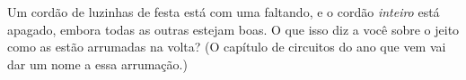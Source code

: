 \begin{exercise}[$\star\star$]\label{exo:g3:first-electric-circuit:11}
Um cordão de luzinhas de festa está com uma  faltando, e o
cordão \emph{inteiro} está apagado, embora todas as outras 
estejam boas. O que isso diz a você sobre o jeito como as 
estão arrumadas na volta? (O capítulo de circuitos do ano que vem vai
dar um nome a essa arrumação.)
\end{exercise}
